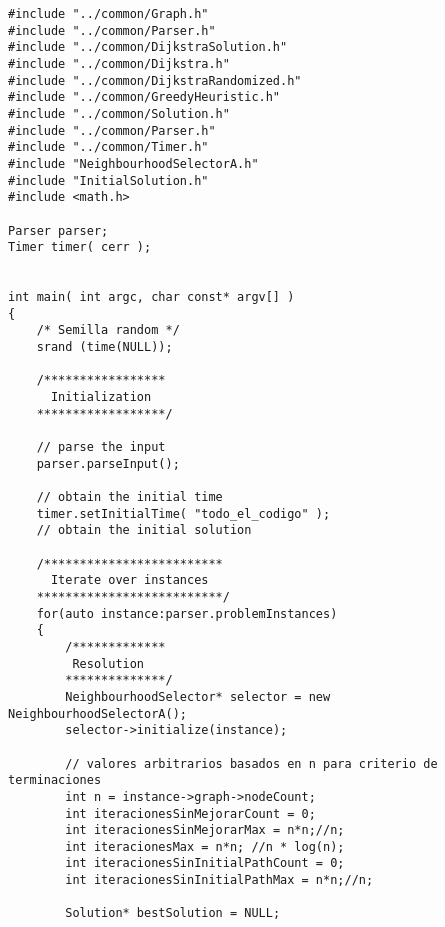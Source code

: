 \begin{lstlisting}[caption=grasp.cpp]
#include "../common/Graph.h"
#include "../common/Parser.h"
#include "../common/DijkstraSolution.h"
#include "../common/Dijkstra.h"
#include "../common/DijkstraRandomized.h"
#include "../common/GreedyHeuristic.h"
#include "../common/Solution.h"
#include "../common/Parser.h"
#include "../common/Timer.h"
#include "NeighbourhoodSelectorA.h"
#include "InitialSolution.h"
#include <math.h>

Parser parser;
Timer timer( cerr );


int main( int argc, char const* argv[] ) 
{
    /* Semilla random */
    srand (time(NULL));

    /*****************
      Initialization
    ******************/
            
    // parse the input
    parser.parseInput();  

    // obtain the initial time
    timer.setInitialTime( "todo_el_codigo" );
    // obtain the initial solution

    /*************************
      Iterate over instances
    **************************/
    for(auto instance:parser.problemInstances)
    {        
        /*************
         Resolution
        **************/           
        NeighbourhoodSelector* selector = new NeighbourhoodSelectorA();
        selector->initialize(instance);                        

        // valores arbitrarios basados en n para criterio de terminaciones
        int n = instance->graph->nodeCount;
        int iteracionesSinMejorarCount = 0;
        int iteracionesSinMejorarMax = n*n;//n;
        int iteracionesMax = n*n; //n * log(n);
        int iteracionesSinInitialPathCount = 0;
        int iteracionesSinInitialPathMax = n*n;//n;
        
        Solution* bestSolution = NULL;            


\end{lstlisting}
